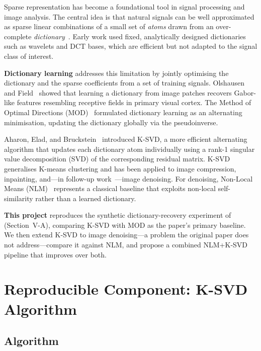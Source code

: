 \documentclass[conference]{IEEEtran}
\begin{document}
Sparse representation has become a foundational tool in signal
processing and image analysis.
The central idea is that natural signals can be well approximated
as sparse linear combinations of a small set of \emph{atoms}
drawn from an over-complete \emph{dictionary}~\cite{mallat1993matching}.
Early work used fixed, analytically designed dictionaries such as
wavelets and DCT bases, which are efficient but not adapted to
the signal class of interest.

\textbf{Dictionary learning} addresses this limitation by jointly
optimising the dictionary and the sparse coefficients from a set
of training signals.
Olshausen and Field~\cite{olshausen1996sparse} showed that
learning a dictionary from image patches recovers Gabor-like
features resembling receptive fields in primary visual cortex.
The Method of Optimal Directions (MOD)~\cite{engan1999mod}
formulated dictionary learning as an alternating minimisation,
updating the dictionary globally via the pseudoinverse.

Aharon, Elad, and Bruckstein~\cite{aharon2006ksvd} introduced
K-SVD, a more efficient alternating algorithm that updates each
dictionary atom individually using a rank-1 singular value
decomposition (SVD) of the corresponding residual matrix.
K-SVD generalises K-means clustering and has been applied to
image compression, inpainting, and---in follow-up
work~\cite{elad2006denoising}---image denoising.
For denoising, Non-Local Means (NLM)~\cite{buades2005nlm}
represents a classical baseline that exploits non-local
self-similarity rather than a learned dictionary.

\textbf{This project} reproduces the synthetic dictionary-recovery
experiment of~\cite{aharon2006ksvd} (Section~V-A), comparing
K-SVD with MOD as the paper's primary baseline.
We then extend K-SVD to image denoising---a problem the original
paper does not address---compare it against NLM, and propose a
combined NLM+K-SVD pipeline that improves over both.

\section{Reproducible Component: K-SVD Algorithm}

\subsection{Algorithm}
\end{document}
